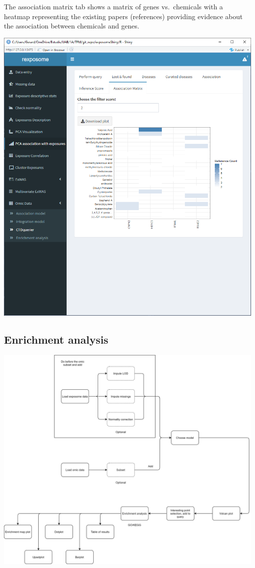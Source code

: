 \documentclass[
]{book}
\begin{document}
The association matrix tab shows a matrix of genes vs.~chemicals with a heatmap representing the existing papers (references) providing evidence about the association between chemicals and genes.

\includegraphics{images/analysis10_9.png}

\hypertarget{enrichment-analysis}{%
\subsection{Enrichment analysis}\label{enrichment-analysis}}

\includegraphics{images/analysis11.png}
\end{document}
